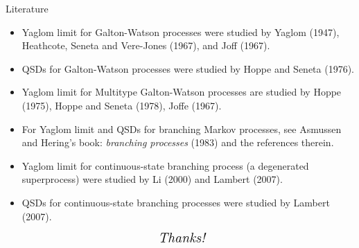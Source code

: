 \documentclass[xcolor=dvipsnames]{beamer}
\begin{document}
\begin{frame}{Literature}
\begin{itemize}
\item 
	Yaglom limit for Galton-Watson processes were studied by Yaglom (1947), Heathcote, Seneta and Vere-Jones (1967), and Joff (1967).
\item 
	QSDs for Galton-Watson processes were studied by Hoppe and Seneta (1976).
\item 
	Yaglom limit for Multitype Galton-Watson processes are studied by Hoppe (1975), Hoppe and Seneta (1978), Joffe (1967).
\item 
	For Yaglom limit and QSDs for branching Markov processes, see Asmussen and Hering's book: \emph{branching processes} (1983) and the references therein. 
\item 
	Yaglom limit for continuous-state branching process (a degenerated superprocess) were studied by Li (2000) and Lambert (2007).
\item 
	QSDs for continuous-state branching processes were studied by Lambert (2007).
\end{itemize}
\end{frame}

\begin{frame}
  \[ \text{ \it \Large Thanks!}\]
\end{frame}
\end{document}
